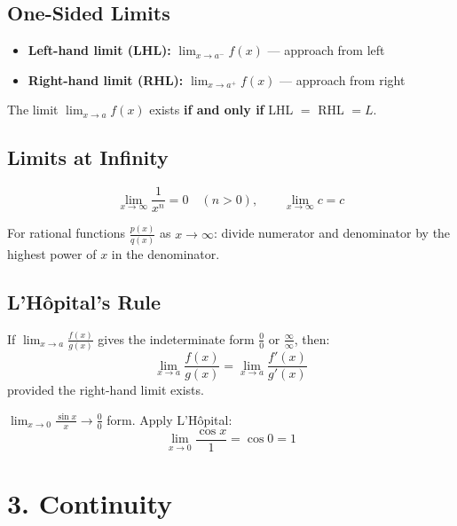 \documentclass[12pt]{article}
\begin{document}
\subsection{One-Sided Limits}

\begin{itemize}[leftmargin=16pt]
  \item \textbf{Left-hand limit (LHL):} $\displaystyle\lim_{x \to a^-} f(x)$ — approach from left
  \item \textbf{Right-hand limit (RHL):} $\displaystyle\lim_{x \to a^+} f(x)$ — approach from right
\end{itemize}

\begin{keybox}
The limit $\displaystyle\lim_{x \to a} f(x)$ exists \textbf{if and only if} LHL $=$ RHL $= L$.
\end{keybox}

\subsection{Limits at Infinity}

\[
  \lim_{x \to \infty} \frac{1}{x^n} = 0 \quad (n > 0), \qquad
  \lim_{x \to \infty} c = c
\]

For rational functions $\frac{p(x)}{q(x)}$ as $x \to \infty$: divide numerator and denominator by the highest power of $x$ in the denominator.

\subsection{L'H\^{o}pital's Rule}

\begin{thmbox}
If $\displaystyle\lim_{x\to a}\frac{f(x)}{g(x)}$ gives the indeterminate form $\frac{0}{0}$ or $\frac{\infty}{\infty}$, then:
\[
  \lim_{x \to a}\frac{f(x)}{g(x)} = \lim_{x \to a}\frac{f'(x)}{g'(x)}
\]
provided the right-hand limit exists.
\end{thmbox}

\begin{examplebox*}
$\displaystyle\lim_{x \to 0}\frac{\sin x}{x} \to \frac{0}{0}$ form.
Apply L'H\^{o}pital:
\[
  \lim_{x \to 0}\frac{\cos x}{1} = \cos 0 = 1
\]
\end{examplebox*}

\section{3. Continuity}
\end{document}

